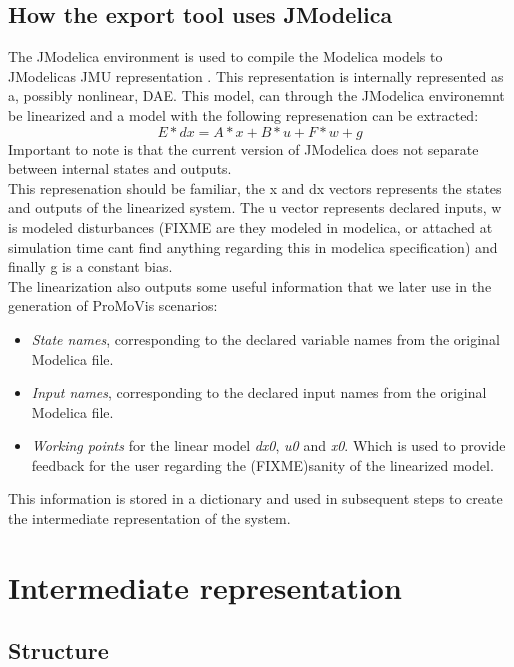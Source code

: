 \documentclass{report}
\begin{document}
\subsection{How the export tool uses JModelica}
The JModelica environment is used to compile the Modelica models to JModelicas JMU representation \cite{PythonAPI}. This representation is internally represented as a, possibly nonlinear, DAE. This model, can through the JModelica environemnt be linearized and a model with the following represenation can be extracted:
\begin{equation}
E*dx = A*x + B*u + F*w + g
\end{equation}
Important to note is that the current version of JModelica\cite{JModelicaVer} does not separate between internal states and outputs. \\This represenation should be familiar, the x and dx vectors represents the states and outputs of the linearized system. The u vector represents declared inputs, w is modeled disturbances (FIXME are they modeled in modelica, or attached at simulation time cant find anything regarding this in modelica specification) and finally g is a constant bias.\\The linearization also outputs some useful information that we later use in the generation of ProMoVis scenarios:
\begin{itemize}
\item \textit{State names}, corresponding to the declared variable names from the original Modelica file.
\item \textit{Input names}, corresponding to the declared input names from the original Modelica file.
\item \textit{Working points} for the linear model \textit{dx0}, \textit{u0} and \textit{x0}. Which is used to provide feedback for the user regarding the (FIXME)sanity of the linearized model.
\end{itemize}

This information is  stored in a dictionary and used in subsequent steps to create the intermediate representation of the system.


\section{Intermediate representation}
\subsection{Structure}
\end{document}
